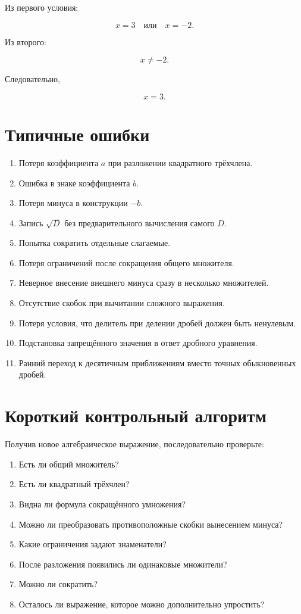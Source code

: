 \documentclass[a4paper,12pt]{article}
\begin{document}
Из первого условия:

\[
x=3
\quad\text{или}\quad
x=-2.
\]

Из второго:

\[
x\ne-2.
\]

Следовательно,

\[
\boxed{x=3}.
\]


\section{Типичные ошибки}

\begin{enumerate}
  \item Потеря коэффициента \(a\) при разложении квадратного трёхчлена.
  \item Ошибка в знаке коэффициента \(b\).
  \item Потеря минуса в конструкции \(-b\).
  \item Запись \(\sqrt D\) без предварительного вычисления самого \(D\).
  \item Попытка сократить отдельные слагаемые.
  \item Потеря ограничений после сокращения общего множителя.
  \item Неверное внесение внешнего минуса сразу в несколько множителей.
  \item Отсутствие скобок при вычитании сложного выражения.
  \item Потеря условия, что делитель при делении дробей должен быть ненулевым.
  \item Подстановка запрещённого значения в ответ дробного уравнения.
  \item Ранний переход к десятичным приближениям вместо точных обыкновенных дробей.
\end{enumerate}


\section{Короткий контрольный алгоритм}

Получив новое алгебраическое выражение, последовательно проверьте:

\begin{enumerate}
  \item Есть ли общий множитель?
  \item Есть ли квадратный трёхчлен?
  \item Видна ли формула сокращённого умножения?
  \item Можно ли преобразовать противоположные скобки вынесением минуса?
  \item Какие ограничения задают знаменатели?
  \item После разложения появились ли одинаковые множители?
  \item Можно ли сократить?
  \item Осталось ли выражение, которое можно дополнительно упростить?
\end{enumerate}
\end{document}
